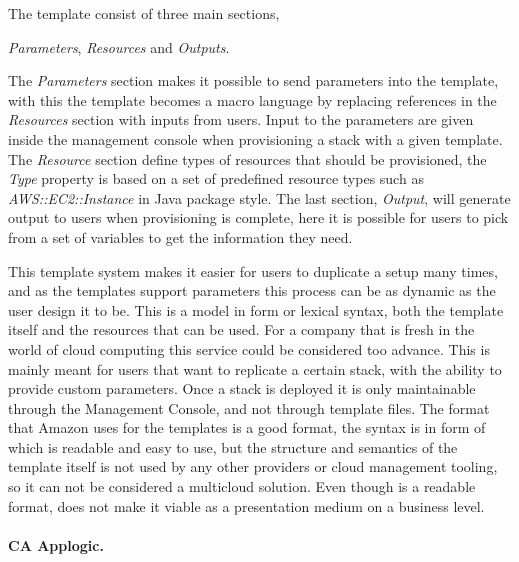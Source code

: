 The template consist of three main sections, 
\begin{ii}\iitem \emph{Parameters}, \iitem \emph{Resources} and \iitem \emph{Outputs}.\end{ii}
The \emph{Parameters} section makes it possible to send parameters into the template, 
with this the template becomes a macro language by replacing 
references in the \emph{Resources} section with inputs from users. 
Input to the parameters are given inside the management console when 
provisioning a stack with a given template.
The \emph{Resource} section define types of resources that should be provisioned, the \emph{Type}
property is based on a set of predefined resource types such as \emph{AWS::EC2::Instance}
in Java package style.
The last section, \emph{Output}, will generate output to users when provisioning is complete,
here it is possible for users to pick from a set of variables to get the information they need.

This template system makes it easier for users to duplicate a setup many times, 
and as the templates support parameters this process can be as dynamic as the user design it to be. 
This is a model in form or lexical syntax, both the template itself 
and the resources that can be used.
For a company that is fresh in the world of cloud computing this service 
could be considered too advance. 
This is mainly meant for users that want to replicate a certain stack, 
with the ability to provide custom parameters. 
Once a stack is deployed it is only maintainable through the  Management Console, 
and not through template files. 
The format that Amazon uses for the templates is a good format, 
the syntax is in form of  which is readable and easy to use, 
but the structure and semantics of the template itself is not used by any 
other providers or cloud management tooling, 
so it can not be considered a multicloud solution. 
Even though  is a readable format, 
does not make it viable as a presentation medium on a business level.

\paragraph{CA Applogic.}~\cite{applogic}



